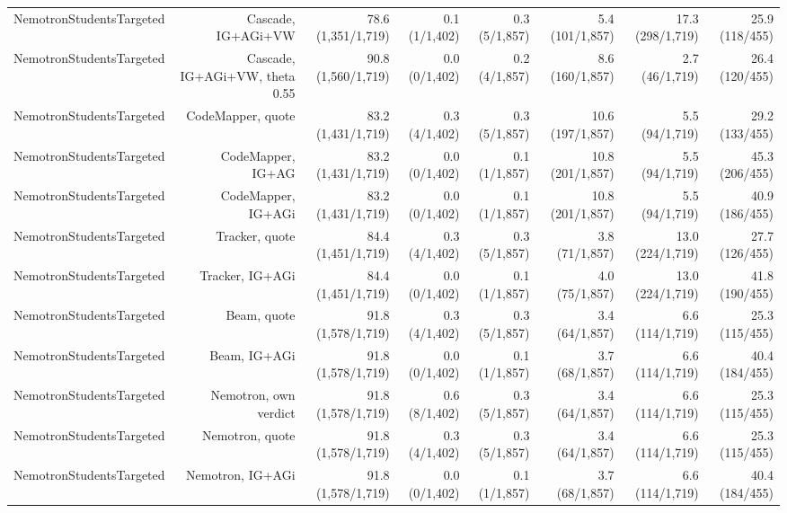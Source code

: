 \begin{table}[t]
{\begin{tabular}{@{}lrrrrrrr@{}}
NemotronStudentsTargeted & Cascade, IG+AGi+VW & 78.6 (1,351/1,719) & 0.1 (1/1,402) & 0.3 (5/1,857) & 5.4 (101/1,857) & 17.3 (298/1,719) & 25.9 (118/455) \\
NemotronStudentsTargeted & Cascade, IG+AGi+VW, theta 0.55 & 90.8 (1,560/1,719) & 0.0 (0/1,402) & 0.2 (4/1,857) & 8.6 (160/1,857) & 2.7 (46/1,719) & 26.4 (120/455) \\
NemotronStudentsTargeted & CodeMapper, quote & 83.2 (1,431/1,719) & 0.3 (4/1,402) & 0.3 (5/1,857) & 10.6 (197/1,857) & 5.5 (94/1,719) & 29.2 (133/455) \\
NemotronStudentsTargeted & CodeMapper, IG+AG & 83.2 (1,431/1,719) & 0.0 (0/1,402) & 0.1 (1/1,857) & 10.8 (201/1,857) & 5.5 (94/1,719) & 45.3 (206/455) \\
NemotronStudentsTargeted & CodeMapper, IG+AGi & 83.2 (1,431/1,719) & 0.0 (0/1,402) & 0.1 (1/1,857) & 10.8 (201/1,857) & 5.5 (94/1,719) & 40.9 (186/455) \\
NemotronStudentsTargeted & Tracker, quote & 84.4 (1,451/1,719) & 0.3 (4/1,402) & 0.3 (5/1,857) & 3.8 (71/1,857) & 13.0 (224/1,719) & 27.7 (126/455) \\
NemotronStudentsTargeted & Tracker, IG+AGi & 84.4 (1,451/1,719) & 0.0 (0/1,402) & 0.1 (1/1,857) & 4.0 (75/1,857) & 13.0 (224/1,719) & 41.8 (190/455) \\
NemotronStudentsTargeted & Beam, quote & 91.8 (1,578/1,719) & 0.3 (4/1,402) & 0.3 (5/1,857) & 3.4 (64/1,857) & 6.6 (114/1,719) & 25.3 (115/455) \\
NemotronStudentsTargeted & Beam, IG+AGi & 91.8 (1,578/1,719) & 0.0 (0/1,402) & 0.1 (1/1,857) & 3.7 (68/1,857) & 6.6 (114/1,719) & 40.4 (184/455) \\
NemotronStudentsTargeted & Nemotron, own verdict & 91.8 (1,578/1,719) & 0.6 (8/1,402) & 0.3 (5/1,857) & 3.4 (64/1,857) & 6.6 (114/1,719) & 25.3 (115/455) \\
NemotronStudentsTargeted & Nemotron, quote & 91.8 (1,578/1,719) & 0.3 (4/1,402) & 0.3 (5/1,857) & 3.4 (64/1,857) & 6.6 (114/1,719) & 25.3 (115/455) \\
NemotronStudentsTargeted & Nemotron, IG+AGi & 91.8 (1,578/1,719) & 0.0 (0/1,402) & 0.1 (1/1,857) & 3.7 (68/1,857) & 6.6 (114/1,719) & 40.4 (184/455) \\
\bottomrule
\end{tabular}
}
\end{table}

